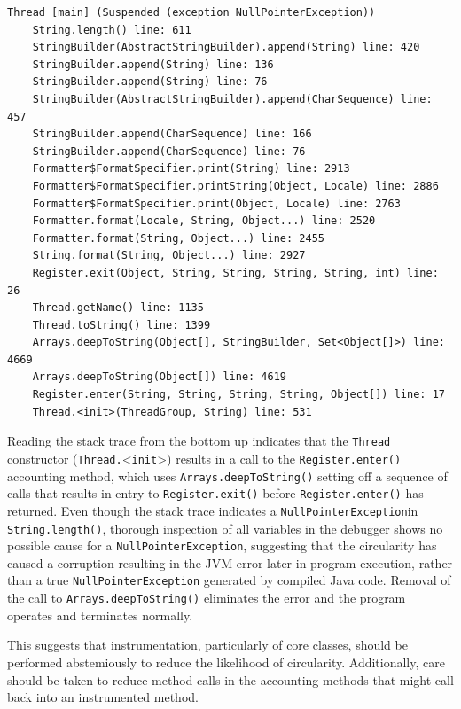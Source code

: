 \documentclass[]{final_report}
\begin{document}
\begin{lstlisting}[caption=Eclipse Stack Trace on Circular Method Reference]
Thread [main] (Suspended (exception NullPointerException))    
    String.length() line: 611    
    StringBuilder(AbstractStringBuilder).append(String) line: 420    
    StringBuilder.append(String) line: 136    
    StringBuilder.append(String) line: 76    
    StringBuilder(AbstractStringBuilder).append(CharSequence) line: 457    
    StringBuilder.append(CharSequence) line: 166    
    StringBuilder.append(CharSequence) line: 76    
    Formatter$FormatSpecifier.print(String) line: 2913    
    Formatter$FormatSpecifier.printString(Object, Locale) line: 2886    
    Formatter$FormatSpecifier.print(Object, Locale) line: 2763    
    Formatter.format(Locale, String, Object...) line: 2520    
    Formatter.format(String, Object...) line: 2455    
    String.format(String, Object...) line: 2927    
    Register.exit(Object, String, String, String, String, int) line: 26    
    Thread.getName() line: 1135    
    Thread.toString() line: 1399    
    Arrays.deepToString(Object[], StringBuilder, Set<Object[]>) line: 4669    
    Arrays.deepToString(Object[]) line: 4619    
    Register.enter(String, String, String, String, Object[]) line: 17    
    Thread.<init>(ThreadGroup, String) line: 531    
\end{lstlisting}

Reading the stack trace from the bottom up indicates that the \lstinline{Thread} constructor \linebreak[4] (\lstinline{Thread.}\textless\lstinline{init}\textgreater) results in a call to the \lstinline{Register.enter()} accounting method, which uses \linebreak[4]\lstinline{Arrays.deepToString()} setting off a sequence of calls that results in entry to \lstinline{Register.exit()} before \lstinline{Register.enter()} has returned. Even though the stack trace indicates a \lstinline{NullPointerException}in \lstinline{String.length()}, thorough inspection of all variables in the debugger shows no possible cause for a \lstinline{NullPointerException}\noop{}, suggesting that the circularity has caused a corruption resulting in the JVM error later in program execution, rather than a true \lstinline{NullPointerException} generated by compiled Java code. Removal of the call to \lstinline{Arrays.deepToString()} eliminates the error and the program operates and terminates normally.

This suggests that instrumentation, particularly of core classes, should be performed abstemiously to reduce  the likelihood of circularity. Additionally, care should be taken to reduce method calls in the accounting methods that might call back into an instrumented method.
\end{document}
